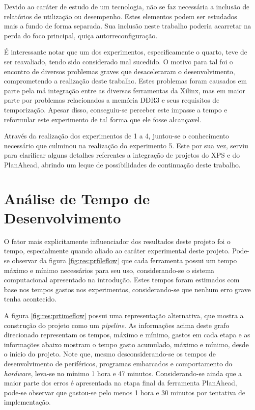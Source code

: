 \documentclass[11pt,a4paper,oneside]{book}
\begin{document}
Devido ao caráter de estudo de um tecnologia, não se faz necessária a inclusão de relatórios de utilização ou desempenho.
Estes elementos podem ser estudados mais a fundo de forma separada.
Sua inclusão neste trabalho poderia acarretar na perda do foco principal, quiça autorreconfiguração.

É interessante notar que um dos experimentos, especificamente o quarto, teve de ser reavaliado, tendo sido considerado mal sucedido.
O motivo para tal foi o encontro de diversos problemas graves que desaceleraram o desenvolvimento, comprometendo a realização deste trabalho.
Estes problemas foram causados em parte pela má integração entre as diversas ferramentas da Xilinx, mas em maior parte por problemas relacionados a memória DDR3 e seus requisitos de temporização.
Apesar disso, conseguiu-se perceber este impasse a tempo e reformular este experimento de tal forma que ele fosse alcançavel.

Através da realização dos experimentos de 1 a 4, juntou-se o conhecimento necessário que culminou na realização do experimento 5.
Este por sua vez, serviu para clarificar alguns detalhes referentes a integração de projetos do XPS e do PlanAhead, abrindo um leque de possibilidades de continuação deste trabalho.

\section{Análise de Tempo de Desenvolvimento}
O fator mais explicitamente influenciador dos resultados deste projeto foi o tempo, especialmente quando aliado ao caráter experimental deste projeto.
Pode-se observar da figura \ref{fig:res:prfileflow} que cada ferramenta possui um tempo máximo e mínimo necessários para seu uso, considerando-se o sistema computacional apresentado na introdução.
Estes tempos foram estimados com base nos tempos gastos nos experimentos, considerando-se que nenhum erro grave tenha acontecido.

A figura \ref{fig:res:prtimeflow} possui uma representação alternativa, que mostra a construção do projeto como um \textit{pipeline}.
As informações acima deste grafo direcionado representam os tempos, máximo e mínimo, gastos em cada etapa e as informações abaixo mostram o tempo gasto acumulado, máximo e mínimo, desde o início do projeto.
Note que, mesmo desconsiderando-se os tempos de desenvolvimento de periféricos, programas embarcados e comportamento do \textit{hardware}, leva-se no mínimo 1 hora e 47 minutos.
Considerando-se ainda que a maior parte dos erros é apresentada na etapa final da ferramenta PlanAhead, pode-se observar que gastou-se pelo menos 1 hora e 30 minutos por tentativa de implementação.
\end{document}
